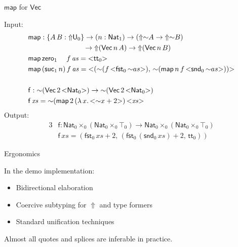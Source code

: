 \documentclass[dvipsnames,aspectratio=169]{beamer}
\renewcommand{\mit}[1]{\mathit{#1}}
\newcommand{\msf}[1]{\mathsf{#1}}
\newcommand{\Lift}{{\Uparrow}}
\newcommand{\spl}{{\sim}}
\newcommand{\qut}[1]{{<}#1{>}}
\newcommand{\U}{\msf{U}}
\newcommand{\Nat}{\msf{Nat}}
\newcommand{\zero}{\msf{zero}}
\newcommand{\suc}{\msf{suc}}
\renewcommand{\tt}{\msf{tt}}
\newcommand{\fst}{\msf{fst}}
\newcommand{\snd}{\msf{snd}}
\theoremstyle{remark}
\newcommand{\Vect}{\msf{Vec}}
\begin{document}
\begin{frame}{$\msf{map}$ for $\Vect$}

Input:
\begin{alignat*}{3}
  &\msf{map} : \{A\,B : \Lift \U_0\} \to
  (n : \Nat_1) \to (\Lift\spl A \to \Lift\spl B) \\
  & \hspace{7.8em} \to \Lift(\Vect\,n\,A) \to \Lift(\Vect\,n\,B)\\
  &\msf{map}\,\zero_1\hspace{1.3em}f\,\mit{as} = \qut{\tt_0} \\
  &\msf{map}\,(\suc_1\,n)\,f\,\mit{as} =
    \qut{(\spl(f\,\qut{\fst_0\,\spl as}),\,\spl(\msf{map}\,n\,f\,\qut{\snd_0\,\spl as}))} \\
  & \\
  & \msf{f} : \spl(\Vect\,2\,\qut{\Nat_0}) \to \spl(\Vect\,2\,\qut{\Nat_0}) \\
  & \msf{f}\,\mit{xs} = \spl(\msf{map}\,2\,(\lambda\,x.\,\qut{\spl x + 2})\,\qut{\mit{xs}}
\end{alignat*}
\pause
Output:
\begin{alignat*}{3}
  & \msf{f} : \Nat_0 \times_0 (\Nat_0 \times_0 \top_0) \to \Nat_0 \times_0 (\Nat_0 \times_0 \top_0) \\
  & \msf{f}\,\mit{xs} = (\fst_0\,\mit{xs} + 2,\,(\fst_0\,(\snd_0\,\mit{xs}) + 2,\,\tt_0))
\end{alignat*}

\end{frame}

\begin{frame}{Ergonomics}

In the demo implementation:
\vspace{1em}

\begin{itemize}
  \item Bidirectional elaboration
  \item Coercive subtyping for $\Lift$ and type formers
  \item Standard unification techniques
\end{itemize}
\vspace{1em}

Almost all quotes and splices are inferable in practice.

\end{frame}
\end{document}
